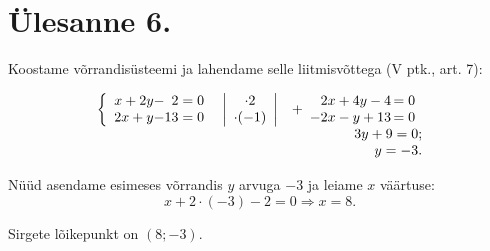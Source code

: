 \section{Ülesanne 6.}

\begin{solution}
Koostame võrrandisüsteemi ja lahendame selle liitmisvõttega (V ptk., art. 7):

\begin{equation}
\begin{array}{rr}
	\left\{
	\begin{array}{*{3}{r@{}}}
	 x + 2y&-&2=0  \\
	2x + y&-&13=0
	\end{array}
	\right.

	\quad

	\left|
		\begin{array}{c}
		\cdot2\\
		\cdot(-1) 
		\end{array}
	\right|&
	+
	\begin{array}{r@{\,}l}
		2x+4y-4 &=0\\
		-2x-y+13&=0
	\end{array} 
	\\
	& 3y+9=0;\\
	& y=-3.
\end{array}
\end{equation}

\end{solution}

Nüüd asendame esimeses võrrandis $y$ arvuga $-3$ ja leiame $x$ väärtuse:
\begin{equation}
x+2\cdot(-3)-2=0 \Rightarrow x=8.
\end{equation}

\begin{answer}
Sirgete lõikepunkt on $(8; -3)$.
\end{answer}
